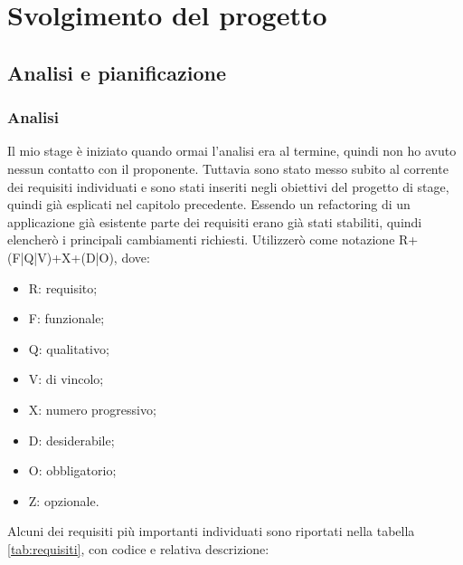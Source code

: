 
\chapter{Svolgimento del progetto}
\label{cap:ilprogetto}


\section{Analisi e pianificazione}

\subsection{Analisi}
Il mio stage è iniziato quando ormai l'analisi era al termine, quindi non ho avuto nessun contatto con il proponente. Tuttavia sono stato messo subito al corrente dei
requisiti individuati e sono stati inseriti negli obiettivi del progetto di stage, quindi già esplicati nel capitolo precedente. Essendo un refactoring di un applicazione
già esistente parte dei requisiti erano già stati stabiliti, quindi elencherò i principali cambiamenti richiesti. Utilizzerò come notazione R+(F|Q|V)+X+(D|O), dove:

\begin{itemize}
  \item R: requisito;
  \item F: funzionale;
  \item Q: qualitativo;
  \item V: di vincolo;
  \item X: numero progressivo;
  \item D: desiderabile;
  \item O: obbligatorio;
  \item Z: opzionale.
\end{itemize}

Alcuni dei requisiti più importanti individuati sono riportati nella tabella \autoref{tab:requisiti}, con codice e relativa descrizione:

